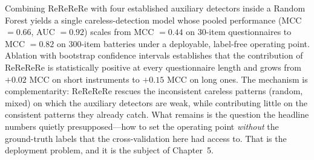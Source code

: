 \documentclass[doc,11pt,donotrepeattitle]{apa7}
\begin{document}
Combining ReReReRe with four established auxiliary detectors inside a Random
Forest yields a single careless-detection model whose pooled performance
(MCC $= 0.66$, AUC $= 0.92$) scales from MCC $= 0.44$ on 30-item questionnaires
to MCC $= 0.82$ on 300-item batteries under a deployable, label-free operating
point. Ablation with bootstrap confidence intervals establishes that the
contribution of ReReReRe is statistically positive at every questionnaire length
and grows from $+0.02$ MCC on short instruments to $+0.15$ MCC on long ones. The
mechanism is complementarity: ReReReRe rescues the inconsistent careless patterns
(random, mixed) on which the auxiliary detectors are weak, while contributing
little on the consistent patterns they already catch. What remains is the
question the headline numbers quietly presupposed---how to set the operating
point \emph{without} the ground-truth labels that the cross-validation here had
access to. That is the deployment problem, and it is the subject of Chapter~5.

\printbibliography
\end{document}
